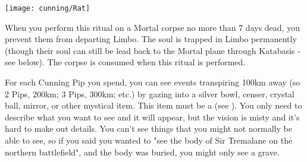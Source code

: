 

\begin{center}
\texttt{[image: cunning/Rat]}
\end{center}




\OCCULT[
  Name=Damning,
  Link=occultism-damning,
  Pips=5,
  Time=Days
]

When you perform this ritual on a Mortal corpse no more than 7 days dead, you prevent them from departing Limbo.  The soul is trapped in Limbo permanently (though their soul can still be lead back to the Mortal plane through Katabasis - see below).  The corpse is consumed when this ritual is performed.


\OCCULT[
  Name=Descry,
  Link=occultism-descry,
  Pips=See below,
  Time=Days
]

For each Cunning Pip you spend, you can see events transpiring 100km away (so 2 Pips, 200km; 3 Pips, 300km; etc.) by gazing into a silver bowl, censer, crystal ball, mirror, or other mystical item. This item must be a  (see ).  You only need to describe what you want to see and it will appear, but the vision is misty and it's hard to make out details.  You can't see things that you might not normally be able to see, so if you said you wanted to "see the body of Sir Tremalane on the northern battlefield", and the body was buried, you might only see a grave.

